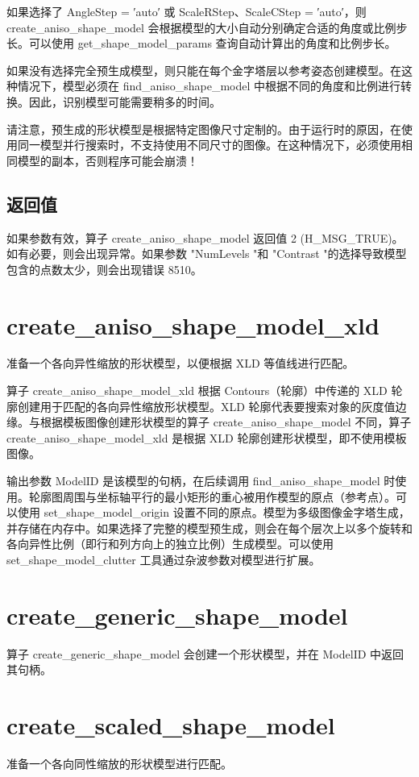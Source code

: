 \documentclass{article}
\begin{document}
如果选择了 AngleStep = ′auto′ 或 ScaleRStep、ScaleCStep = ′auto′，则 create\_aniso\_shape\_model 会根据模型的大小自动分别确定合适的角度或比例步长。可以使用 get\_shape\_model\_params 查询自动计算出的角度和比例步长。

如果没有选择完全预生成模型，则只能在每个金字塔层以参考姿态创建模型。在这种情况下，模型必须在 find\_aniso\_shape\_model 中根据不同的角度和比例进行转换。因此，识别模型可能需要稍多的时间。

请注意，预生成的形状模型是根据特定图像尺寸定制的。由于运行时的原因，在使用同一模型并行搜索时，不支持使用不同尺寸的图像。在这种情况下，必须使用相同模型的副本，否则程序可能会崩溃！

\subsection{返回值}
如果参数有效，算子 create\_aniso\_shape\_model 返回值 2 (H\_MSG\_TRUE)。如有必要，则会出现异常。如果参数 "NumLevels "和 "Contrast "的选择导致模型包含的点数太少，则会出现错误 8510。

\section{create\_aniso\_shape\_model\_xld}
准备一个各向异性缩放的形状模型，以便根据 XLD 等值线进行匹配。

算子 create\_aniso\_shape\_model\_xld 根据 Contours（轮廓）中传递的 XLD 轮廓创建用于匹配的各向异性缩放形状模型。XLD 轮廓代表要搜索对象的灰度值边缘。与根据模板图像创建形状模型的算子 create\_aniso\_shape\_model 不同，算子 create\_aniso\_shape\_model\_xld 是根据 XLD 轮廓创建形状模型，即不使用模板图像。

输出参数 ModelID 是该模型的句柄，在后续调用 find\_aniso\_shape\_model 时使用。轮廓图周围与坐标轴平行的最小矩形的重心被用作模型的原点（参考点）。可以使用 set\_shape\_model\_origin 设置不同的原点。模型为多级图像金字塔生成，并存储在内存中。如果选择了完整的模型预生成，则会在每个层次上以多个旋转和各向异性比例（即行和列方向上的独立比例）生成模型。可以使用 set\_shape\_model\_clutter 工具通过杂波参数对模型进行扩展。

\section{create\_generic\_shape\_model}
算子 create\_generic\_shape\_model 会创建一个形状模型，并在 ModelID 中返回其句柄。

\section{create\_scaled\_shape\_model}
准备一个各向同性缩放的形状模型进行匹配。
\end{document}
